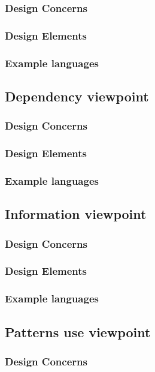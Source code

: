 \documentclass[onecolumn, draftclsnofoot,10pt, compsoc]{IEEEtran}
\begin{document}
\begin{singlespace}
		\subsubsection{Design Concerns}
		\subsubsection{Design Elements}
		\subsubsection{Example languages}
	\subsection{Dependency viewpoint}
		\subsubsection{Design Concerns}
		\subsubsection{Design Elements}
		\subsubsection{Example languages}
	\subsection{Information viewpoint}
		\subsubsection{Design Concerns}
		\subsubsection{Design Elements}
		\subsubsection{Example languages}
	\subsection{Patterns use viewpoint}
		\subsubsection{Design Concerns}

\end{singlespace}
\end{document}
